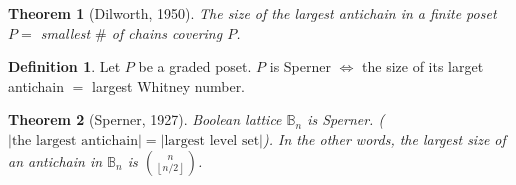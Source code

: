 \documentclass{report}
\newcommand{\B}{\mathbb{B}}
\newtheorem{theorem}{Theorem}[section]
\theoremstyle{definition}
\newtheorem{definition}{Definition}[section]
\theoremstyle{remark}
\numberwithin{equation}{section}
\begin{document}
\begin{theorem}[Dilworth, 1950]
    The size of the largest antichain in a finite poset $P = $ smallest $\#$ of chains covering $P$.
\end{theorem}
\begin{definition}
    Let $P$ be a graded poset. $P$ is Sperner $\iff$ the size of its larget antichain $=$ largest Whitney number.
\end{definition}

\begin{theorem}[Sperner, 1927]
    Boolean lattice $\mathbb{B}_n$ is Sperner. ($|\text{the largest antichain}| = |\text{largest level set}|$). In the other words, the largest size of an antichain in $\B_n$ is $\binom{n}{\left\lfloor n/2 \right\rfloor}$.
\end{theorem}
\end{document}
